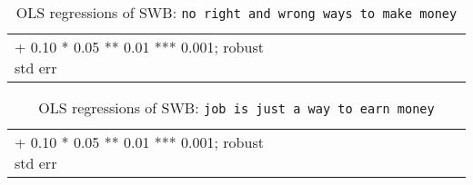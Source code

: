\documentclass[10pt, letterpaper]{article}
\begin{document}
\begin{spacing}{1.8}
\begin{spacing}{.9} \begin{table}[H]\centering  \label{c} \begin{scriptsize} \begin{tabular}{p{1.8in}p{.5in}p{.5in}p{.5in}p{.5in}p{.5in}p{.5in}p{.5in}p{.5in}p{.5in}p{.5 in}p{.5in}p{.5 in}}\hline  \hline + 0.10 * 0.05 ** 0.01 *** 0.001; robust std err \end{tabular}\end{scriptsize}\caption{OLS regressions of SWB:  \texttt{no right  and wrong ways to  make money}}\end{table} \end{spacing}

\begin{spacing}{.9} \begin{table}[H]\centering  \label{d} \begin{scriptsize} \begin{tabular}{p{1.8in}p{.5in}p{.5in}p{.5in}p{.5in}p{.5in}p{.5in}p{.5in}p{.5in}p{.5in}p{.5 in}p{.5in}p{.5 in}}\hline  \hline + 0.10 * 0.05 ** 0.01 *** 0.001; robust std err \end{tabular}\end{scriptsize}\caption{OLS regressions of SWB:  \texttt{job is just a way to earn money}}\end{table} \end{spacing}
 







\end{spacing}
\end{document}
